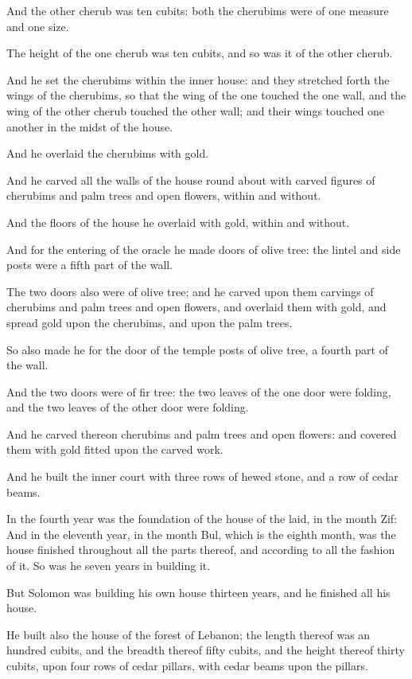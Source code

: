 \Verse And the other cherub was ten cubits: both the cherubims were of one measure and one size.

\Verse The height of the one cherub was ten cubits, and so was it of the other cherub.

\Verse And he set the cherubims within the inner house: and they stretched forth the wings of the cherubims, so that the wing of the one touched the one wall, and the wing of the other cherub touched the other wall; and their wings touched one another in the midst of the house.

\Verse And he overlaid the cherubims with gold.

\Verse And he carved all the walls of the house round about with carved figures of cherubims and palm trees and open flowers, within and without.

\Verse And the floors of the house he overlaid with gold, within and without.

\Verse And for the entering of the oracle he made doors of olive tree: the lintel and side posts were a fifth part of the wall.

\Verse The two doors also were of olive tree; and he carved upon them carvings of cherubims and palm trees and open flowers, and overlaid them with gold, and spread gold upon the cherubims, and upon the palm trees.

\Verse So also made he for the door of the temple posts of olive tree, a fourth part of the wall.

\Verse And the two doors were of fir tree: the two leaves of the one door were folding, and the two leaves of the other door were folding.

\Verse And he carved thereon cherubims and palm trees and open flowers: and covered them with gold fitted upon the carved work.

\Verse And he built the inner court with three rows of hewed stone, and a row of cedar beams.

\Verse In the fourth year was the foundation of the house of the \LORD laid, in the month Zif: \Verse And in the eleventh year, in the month Bul, which is the eighth month, was the house finished throughout all the parts thereof, and according to all the fashion of it. So was he seven years in building it.


\Chapter
\Verse But Solomon was building his own house thirteen years, and he finished all his house.

\Verse He built also the house of the forest of Lebanon; the length thereof was an hundred cubits, and the breadth thereof fifty cubits, and the height thereof thirty cubits, upon four rows of cedar pillars, with cedar beams upon the pillars.

